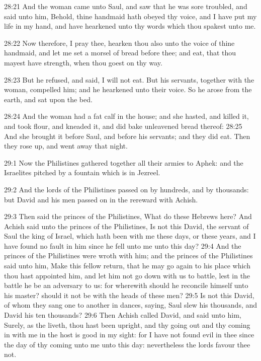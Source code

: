 28:21 And the woman came unto Saul, and saw that he was sore troubled, and said unto him, Behold, thine handmaid hath obeyed thy voice, and I have put my life in my hand, and have hearkened unto thy words which thou spakest unto me.

28:22 Now therefore, I pray thee, hearken thou also unto the voice of thine handmaid, and let me set a morsel of bread before thee; and eat, that thou mayest have strength, when thou goest on thy way.

28:23 But he refused, and said, I will not eat. But his servants, together with the woman, compelled him; and he hearkened unto their voice. So he arose from the earth, and sat upon the bed.

28:24 And the woman had a fat calf in the house; and she hasted, and killed it, and took flour, and kneaded it, and did bake unleavened bread thereof: 28:25 And she brought it before Saul, and before his servants; and they did eat. Then they rose up, and went away that night.

29:1 Now the Philistines gathered together all their armies to Aphek: and the Israelites pitched by a fountain which is in Jezreel.

29:2 And the lords of the Philistines passed on by hundreds, and by thousands: but David and his men passed on in the rereward with Achish.

29:3 Then said the princes of the Philistines, What do these Hebrews here?  And Achish said unto the princes of the Philistines, Is not this David, the servant of Saul the king of Israel, which hath been with me these days, or these years, and I have found no fault in him since he fell unto me unto this day?  29:4 And the princes of the Philistines were wroth with him; and the princes of the Philistines said unto him, Make this fellow return, that he may go again to his place which thou hast appointed him, and let him not go down with us to battle, lest in the battle he be an adversary to us: for wherewith should he reconcile himself unto his master? should it not be with the heads of these men?  29:5 Is not this David, of whom they sang one to another in dances, saying, Saul slew his thousands, and David his ten thousands?  29:6 Then Achish called David, and said unto him, Surely, as the \LORD liveth, thou hast been upright, and thy going out and thy coming in with me in the host is good in my sight: for I have not found evil in thee since the day of thy coming unto me unto this day: nevertheless the lords favour thee not.

